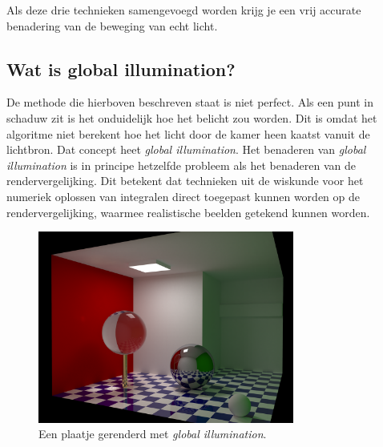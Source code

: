 \documentclass[12pt, a4paper]{article}
\begin{document}
Als deze drie technieken samengevoegd worden krijg je een vrij accurate benadering van de beweging van echt licht.

\subsection{Wat is global illumination?}
De methode die hierboven beschreven staat is niet perfect. Als een punt in schaduw zit is het onduidelijk hoe het belicht zou worden. Dit is omdat het algoritme niet berekent hoe het licht door de kamer heen kaatst vanuit de lichtbron. Dat concept heet \emph{global illumination}. Het benaderen van \emph{global illumination} is in principe hetzelfde probleem als het benaderen van de rendervergelijking. Dit betekent dat technieken uit de wiskunde voor het numeriek oplossen van integralen direct toegepast kunnen worden op de rendervergelijking, waarmee realistische beelden getekend kunnen worden. 

\begin{figure}[H]
    \centering
    \includegraphics[width=0.75\textwidth]{global_illumination.png}
    \caption{Een plaatje gerenderd met \emph{global illumination}.}
    \label{fig:global_illumination}
\end{figure}
\end{document}
